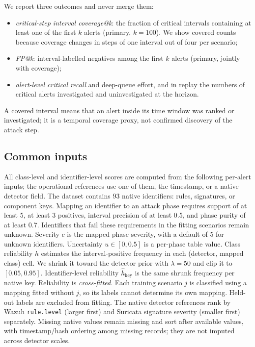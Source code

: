\documentclass[pdflatex,sn-basic,Numbered]{sn-jnl}
\begin{document}
We report three outcomes and never merge them:
\begin{itemize}[leftmargin=*]
\item \emph{critical-step interval coverage@k}: the fraction of critical intervals containing at least one of the first $k$ alerts (primary, $k=100$). We show covered counts because coverage changes in steps of one interval out of four per scenario;
\item \emph{FP@k}: interval-labelled negatives among the first $k$ alerts (primary, jointly with coverage);
\item \emph{alert-level critical recall} and deep-queue effort, and in replay the numbers of critical alerts investigated and uninvestigated at the horizon.
\end{itemize}
A covered interval means that an alert inside its time window was ranked or investigated; it is a temporal coverage proxy, not confirmed discovery of the attack step.

\subsection{Common inputs}
\label{subsec:inputs}

All class-level and identifier-level scores are computed from the following per-alert inputs; the operational references use one of them, the timestamp, or a native detector field. The dataset contains 93 native identifiers: rules, signatures, or component keys. Mapping an identifier to an attack phase requires support of at least 5, at least 3 positives, interval precision of at least 0.5, and phase purity of at least 0.7. Identifiers that fail these requirements in the fitting scenarios remain unknown. Severity $c$ is the mapped phase severity, with a default of 5 for unknown identifiers. Uncertainty $u \in [0, 0.5]$ is a per-phase table value. Class reliability $h$ estimates the interval-positive frequency in each (detector, mapped class) cell. We shrink it toward the detector prior with $\lambda=50$ and clip it to $[0.05, 0.95]$. Identifier-level reliability $\hat h_{\mathrm{key}}$ is the same shrunk frequency per native key. Reliability is \emph{cross-fitted}. Each training scenario $j$ is classified using a mapping fitted without $j$, so its labels cannot determine its own mapping. Held-out labels are excluded from fitting. The native detector references rank by Wazuh \texttt{rule.level} (larger first) and Suricata signature severity (smaller first) separately. Missing native values remain missing and sort after available values, with timestamp/hash ordering among missing records; they are not imputed across detector scales.
\end{document}
